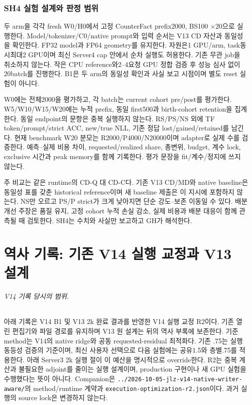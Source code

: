 \documentclass[11pt]{article}
\begin{document}
\section{SH4 실험 설계와 판정 범위}
두 arm을 각각 fresh W0/H0에서 고정 CounterFact prefix2000, BS100 $\times$20으로 실행한다.
Model/tokenizer/C0/native prompt와 입력 순서는 V13 CD 자산과 동일성을 확인한다.
FP32 model과 FP64 geometry를 유지한다. 자원은1 GPU/arm, task동시최대2 GPU이며
최신 Server4 cap 안에서 순차 실행도 허용한다. 기존 무관 job을 취소하지 않는다.
작은 CPU reference와2--4요청 GPU 정합 검증 후 성능 심사 없이20batch를 진행한다.
B1은 두 arm의 동일성 확인과 사실 보고 시점이며 별도 reset 실험이 아니다.

W0에는 전체2000을 평가하고, 각 batch는 current cohort pre/post를 평가한다.
W5/W10/W15/W20에는 누적 prefix, 동일 first500과 birth-cohort retention을 집계한다.
동일 endpoint의 문항은 중복 실행하지 않는다. RS/PS/NS 외에 TF token/prompt/strict ACC,
new/true NLL, 기존 정답 lost/gained/retained를 남긴다. 현재 benchmark W20 분모는
R2000/P4000/N20000이며 adapter로 실제 수를 검증한다.
예측--실제 비용 차이, requested/realized share, 총변위, budget, 계수 lock,
exclusive 시간과 peak memory를 함께 기록한다. 평가 문장을 fit/계수/정지에 쓰지 않는다.

주 비교는 같은 runtime의 CD-Q 대 CD-C다. 기존 V13 CD/MD와 native baseline은
동일성 표를 갖춘 historical reference이며 새 baseline 제출은 이 지시에 포함하지 않는다.
NS만 오르고 PS/P strict가 크게 낮아지면 단순 강도--보존 이동일 수 있다.
배분 개선 주장은 품질 유지, 고정 cohort 누적 손실 감소, 실제 비용과 배분 대응이
함께 관측될 때 검토한다. SH4는 수치와 사실만 보고하고 GH가 해석한다.

\clearpage
\part*{역사 기록: 기존 V14 실행 교정과 V13 설계}
\paragraph{V14 기록 당시의 범위.}
아래 기록은 V14 B1 및 V13 2k 완료 결과를 반영한 V14 실행 교정 R2이다.
기존 열린 편집기와 파일 경로를 유지하며 V13 원 설계는 뒤의 역사 부록에 보존한다.
기준 method는 V14의 native ridge와 공동 requested-residual 최적화다.
기존 .75는 실행 동등성 검증의 기준이며, 최신 사용자 선택으로 다음 실험에는
공유1.5와 층별.75를 적용한다. 아래 Server3 2k 실행 절이 이 예산을 명시적으로 override한다.
R2는 중복 계산과 불필요한 adjoint를 줄이는 실행 설계이며, production 구현이나
새 GPU 실험을 수행했다는 뜻이 아니다. Companion은
\texttt{../2026-10-05-jlz-v14-native-writer-aware/}의 method/runtime 계약과
\texttt{execution-optimization-r2.json}이다. 과거 실행의 source lock은 변경하지 않는다.
\end{document}
